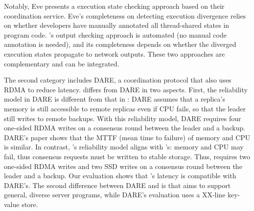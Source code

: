 
Notably, Eve presents a execution state checking approach based on their 
coordination service. Eve's completeness on detecting execution divergence 
relies on whether developers have manually annotated all thread-shared states 
in program code. \xxx's output checking approach is automated (no manual code 
annotation is needed), and its completeness depends on whether the diverged 
execution states propagate to network outputs. These two approaches are 
complementary and can be integrated.

The second category includes DARE, a coordination protocol that also uses RDMA 
to reduce latency. \xxx differs from DARE in two aspects. First, 
the reliability model in DARE is different from that in \paxos: DARE assumes 
that a replica's memory is still accessible to remote replicas even if CPU 
fails, so that the leader still writes to remote backups. With this reliability 
model, DARE requires four one-sided RDMA writes on a consensus round between the 
leader and a backup. DARE's paper shows that the MTTF (mean time to failure) of 
memory and CPU is similar. In contrast, \xxx's reliability model aligns with 
\paxos's: memory and CPU may fail, thus consensus requests must be written to 
stable storage. Thus, \xxx requires two one-sided RDMA writes and two SSD writes 
on a consensus round between the leader and a backup. Our evaluation shows that 
\xxx's latency is compatible with DARE's. The second difference between DARE 
and \xxx is that \xxx aims to support general, diverse server programs, while 
DARE's evaluation uses a XX-line key-value store.





